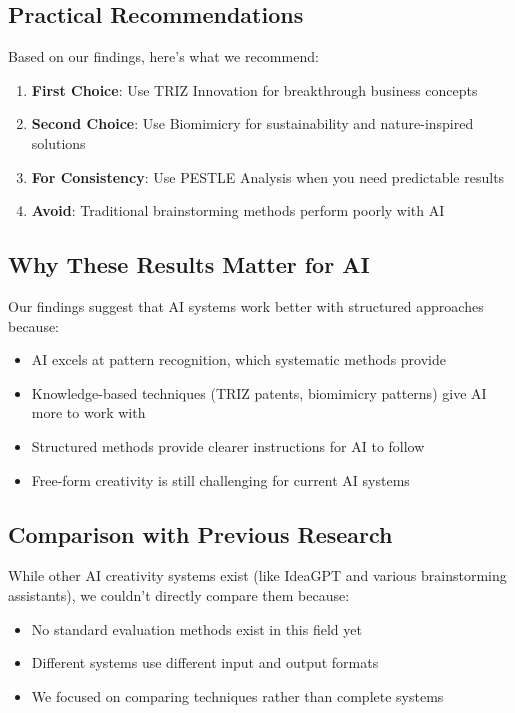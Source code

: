 \documentclass[12pt]{article}
\begin{document}
\subsection{Practical Recommendations}

Based on our findings, here's what we recommend:

\begin{enumerate}
\item \textbf{First Choice}: Use TRIZ Innovation for breakthrough business concepts
\item \textbf{Second Choice}: Use Biomimicry for sustainability and nature-inspired solutions
\item \textbf{For Consistency}: Use PESTLE Analysis when you need predictable results
\item \textbf{Avoid}: Traditional brainstorming methods perform poorly with AI
\end{enumerate}

\subsection{Why These Results Matter for AI}

Our findings suggest that AI systems work better with structured approaches because:
\begin{itemize}
\item AI excels at pattern recognition, which systematic methods provide
\item Knowledge-based techniques (TRIZ patents, biomimicry patterns) give AI more to work with
\item Structured methods provide clearer instructions for AI to follow
\item Free-form creativity is still challenging for current AI systems
\end{itemize}

\subsection{Comparison with Previous Research}

While other AI creativity systems exist (like IdeaGPT and various brainstorming assistants), we couldn't directly compare them because:
\begin{itemize}
\item No standard evaluation methods exist in this field yet
\item Different systems use different input and output formats
\item We focused on comparing techniques rather than complete systems
\end{itemize}
\end{document}
